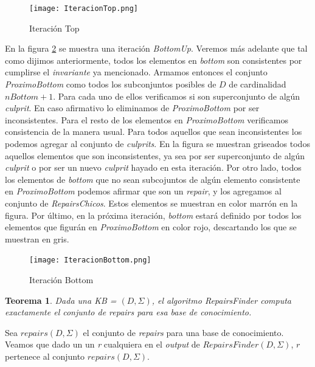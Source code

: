 \documentclass[11pt,a4paper,twoside]{tesis}
\begin{document}
\begin{figure}[ht]
    \texttt{[image: IteracionTop.png]}
    \centering
    \caption{Iteración Top}
    \label{fig:iteracion_top}
\end{figure}

En la figura \ref{fig:iteracion_bottom} se muestra una iteración \textit{BottomUp}. Veremos más adelante que tal como dijimos anteriormente, todos los elementos en \textit{bottom} son consistentes por cumplirse el \textit{invariante} ya mencionado. Armamos entonces el conjunto \textit{ProximoBottom} como todos los subconjuntos posibles de $D$ de cardinalidad $nBottom + 1$. Para cada uno de ellos verificamos si son superconjunto de algún \textit{culprit}. En caso afirmativo lo eliminamos de \textit{ProximoBottom} por ser inconsistentes. Para el resto de los elementos en \textit{ProximoBottom} verificamos consistencia de la manera usual. Para todos aquellos que sean inconsistentes los podemos agregar al conjunto de \textit{culprits}. En la figura se muestran griseados todos aquellos elementos que son inconsistentes, ya sea por ser superconjunto de algún \textit{culprit} o por ser un nuevo \textit{culprit} hayado en esta iteración.
Por otro lado, todos los elementos de \textit{bottom} que no sean subcojuntos de algún elemento consistente en \textit{ProximoBottom} podemos afirmar que son un \textit{repair}, y los agregamos al conjunto de \textit{RepairsChicos}. Estos elementos se muestran en color marrón en la figura. Por último, en la próxima iteración, \textit{bottom} estará definido por todos los elementos que figurán en \textit{ProximoBottom} en color rojo, descartando los que se muestran en gris.


\begin{figure}[ht]
    \texttt{[image: IteracionBottom.png]}
    \centering
    \caption{Iteración Bottom}
    \label{fig:iteracion_bottom}
\end{figure}


\newtheorem{theorem}{Teorema} 
\newtheorem{lemma}[theorem]{Lema}

\begin{theorem}
Dada una \textit{KB} = $(D, \Sigma)$, el algoritmo \textit{RepairsFinder} computa exactamente el conjunto de \textit{repairs} para esa base de conocimiento.
\end{theorem}

Sea $repairs(D, \Sigma)$ el conjunto de \textit{repairs} para una base de conocimiento. Veamos que dado un un \textit{r} cualquiera en el \textit{output} de $RepairsFinder(D, \Sigma)$, $r$ pertenece al conjunto $repairs(D, \Sigma)$.
\end{document}
